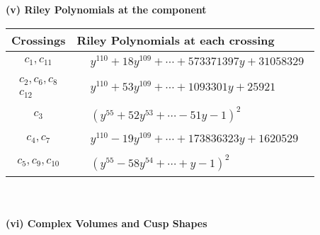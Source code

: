 \documentclass[1p]{elsarticle_modified}
\theoremstyle{definition}
\begin{document}
\newpage\renewcommand{\arraystretch}{1}
\flushleft \textbf{(v) Riley Polynomials at the component}\newline \\
\begin{tabular}{m{50pt}|m{274pt}}
Crossings & \hspace{64pt}Riley Polynomials at each crossing \\
\hline $$\begin{aligned}c_{1},c_{11}\end{aligned}$$&$\begin{aligned}
&y^{110}+18 y^{109}+\cdots+573371397 y+31058329
\end{aligned}$\\
\hline $$\begin{aligned}c_{2},c_{6},c_{8}\\c_{12}\end{aligned}$$&$\begin{aligned}
&y^{110}+53 y^{109}+\cdots+1093301 y+25921
\end{aligned}$\\
\hline $$\begin{aligned}c_{3}\end{aligned}$$&$\begin{aligned}
&(y^{55}+52 y^{53}+\cdots-51 y-1)^{2}
\end{aligned}$\\
\hline $$\begin{aligned}c_{4},c_{7}\end{aligned}$$&$\begin{aligned}
&y^{110}-19 y^{109}+\cdots+173836323 y+1620529
\end{aligned}$\\
\hline $$\begin{aligned}c_{5},c_{9},c_{10}\end{aligned}$$&$\begin{aligned}
&(y^{55}-58 y^{54}+\cdots+y-1)^{2}
\end{aligned}$\\
\hline
\end{tabular}\\~\\
\newpage\flushleft \textbf{(vi) Complex Volumes and Cusp Shapes}
\end{document}
